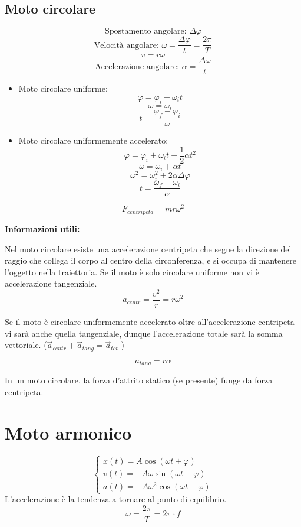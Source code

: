 \documentclass[a4paper]{article}
\theoremstyle{break}
\theoremstyle{break}
\theoremstyle{break}
\theoremstyle{break}
\begin{document}
\subsection{Moto circolare}
\[
  \text{Spostamento angolare: } \Delta \varphi
\] 
\[
  \text{Velocità angolare: } \omega = \frac{\Delta \varphi}{t} = \frac{2 \pi}{T}
\]
\[
v = r \omega
\] 
\[
  \text{Accelerazione angolare: } \alpha = \frac{\Delta \omega}{t}
\] 
\begin{itemize}
  \item Moto circolare uniforme: 
    \[
      \varphi = \varphi_i + \omega_i t
    \] 
    \[
      \omega = \omega_i
    \]
    \[
      t = \frac{\varphi_f - \varphi_i}{\omega}
    \]
  \item Moto circolare uniformemente accelerato:
    \[
      \varphi = \varphi_i + \omega_i t + \frac{1}{2} \alpha t^2
    \]
    \[
      \omega = \omega_i + \alpha t
    \]
    \[
      \omega^2 = \omega_i^2 + 2 \alpha \Delta \varphi
    \]
    \[
      t = \frac{\omega_f - \omega_i}{\alpha}
    \]
\end{itemize}
\vspace{1em}
\[
  F_{centripeta} = m r \omega^2
\] 

\noindent \textbf{Informazioni utili:}

\noindent Nel moto circolare esiste una accelerazione centripeta che segue la direzione 
del raggio che collega il corpo al centro della circonferenza, e si occupa di mantenere 
l’oggetto nella traiettoria. Se il moto è solo circolare uniforme non vi è accelerazione 
tangenziale. 
\[
  a_{centr} = \frac{v^2}{r} = r \omega^2
\] 

\vspace{1em}
\noindent Se il moto è circolare uniformemente accelerato oltre all’accelerazione 
centripeta vi sarà anche quella tangenziale, dunque l’accelerazione totale sarà la somma
vettoriale. (\( \vec{a}_{centr} + \vec{a}_{tang} = \vec{a}_{tot} \) ) 

\[
  a_{tang} = r \alpha
\]  

\vspace{1em}
\noindent In un moto circolare, la forza d’attrito statico (se presente) funge 
da forza centripeta.


\section{Moto armonico}
\[
\begin{cases}
  x(t) = A \cos(\omega t + \varphi)\\
  v(t) = -A \omega \sin(\omega t + \varphi)\\
  a(t) = -A \omega^2 \cos(\omega t + \varphi)
\end{cases}
\] 
L'accelerazione è la tendenza a tornare al punto di equilibrio.
\[
\omega = \frac{2 \pi}{T} = 2 \pi \cdot f
\] 
\end{document}
